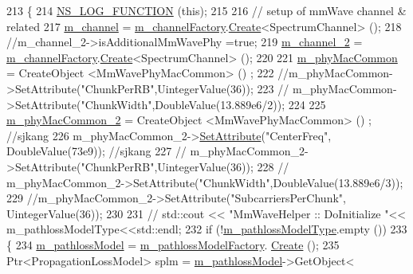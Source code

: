 \begin{DoxyCode}
213 \{
214         \hyperlink{log-macros-disabled_8h_a90b90d5bad1f39cb1b64923ea94c0761}{NS\_LOG\_FUNCTION} (\textcolor{keyword}{this});
215 
216         \textcolor{comment}{// setup of mmWave channel & related}
217         \hyperlink{classns3_1_1MmWaveHelper_adac6d83bc2acef8b7dbd9fc668207d95}{m\_channel} = \hyperlink{classns3_1_1MmWaveHelper_aefd1af1d339f1de2d8b09811162cb554}{m\_channelFactory}.\hyperlink{classns3_1_1ObjectFactory_a18152e93f0a6fe184ed7300cb31e9896}{Create}<SpectrumChannel> ();
218         \textcolor{comment}{//m\_channel\_2->isAdditionalMmWavePhy =true;}
219         \hyperlink{classns3_1_1MmWaveHelper_af0230ef91f1c4defe2a316f5de3ff209}{m\_channel\_2} = \hyperlink{classns3_1_1MmWaveHelper_aefd1af1d339f1de2d8b09811162cb554}{m\_channelFactory}.\hyperlink{classns3_1_1ObjectFactory_a18152e93f0a6fe184ed7300cb31e9896}{Create}<SpectrumChannel> ();
220 
221         \hyperlink{classns3_1_1MmWaveHelper_a6aaa35de743b9a88998de0128b1046b4}{m\_phyMacCommon} = CreateObject <MmWavePhyMacCommon> () ;
222          \textcolor{comment}{//m\_phyMacCommon->SetAttribute("ChunkPerRB",UintegerValue(36));}
223         \textcolor{comment}{//    m\_phyMacCommon->SetAttribute("ChunkWidth",DoubleValue(13.889e6/2));}
224 
225     \hyperlink{classns3_1_1MmWaveHelper_ab4e9d2f9a49a485dadb3404e8c196f4c}{m\_phyMacCommon\_2} = CreateObject <MmWavePhyMacCommon> () ; \textcolor{comment}{//sjkang}
226     m\_phyMacCommon\_2->\hyperlink{classns3_1_1ObjectBase_ac60245d3ea4123bbc9b1d391f1f6592f}{SetAttribute}(\textcolor{stringliteral}{"CenterFreq"}, DoubleValue(73e9)); \textcolor{comment}{//sjkang}
227    \textcolor{comment}{// m\_phyMacCommon\_2->SetAttribute("ChunkPerRB",UintegerValue(36));}
228    \textcolor{comment}{// m\_phyMacCommon\_2->SetAttribute("ChunkWidth",DoubleValue(13.889e6/3));}
229     \textcolor{comment}{//m\_phyMacCommon\_2->SetAttribute("SubcarriersPerChunk", UintegerValue(36));}
230 
231   \textcolor{comment}{//  std::cout << "MmWaveHelper :: DoInitialize "<< m\_pathlossModelType<<std::endl;}
232         \textcolor{keywordflow}{if} (!\hyperlink{classns3_1_1MmWaveHelper_a7f17e9bc4797b51d9a31d16c7e667960}{m\_pathlossModelType}.empty ())
233         \{
234                 \hyperlink{classns3_1_1MmWaveHelper_a4de60027f5a256fe51033e6d6803e9b0}{m\_pathlossModel} = \hyperlink{classns3_1_1MmWaveHelper_a11109a98a7fe9fb7e0c63e891dd50e3c}{m\_pathlossModelFactory}.
      \hyperlink{classns3_1_1ObjectFactory_a18152e93f0a6fe184ed7300cb31e9896}{Create} ();
235                 Ptr<PropagationLossModel> splm = \hyperlink{classns3_1_1MmWaveHelper_a4de60027f5a256fe51033e6d6803e9b0}{m\_pathlossModel}->GetObject<

\end{DoxyCode}
